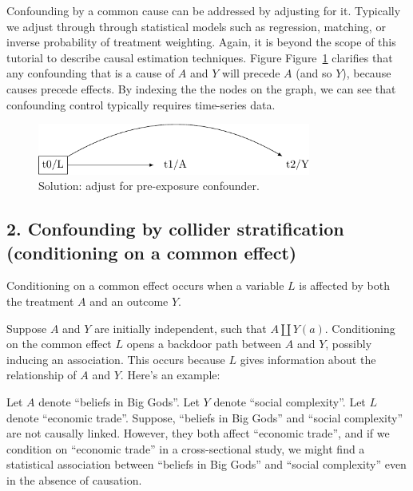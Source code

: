 \documentclass[
  singlecolumn]{report}
\begin{document}
Confounding by a common cause can be addressed by adjusting for it.
Typically we adjust through through statistical models such as
regression, matching, or inverse probability of treatment weighting.
Again, it is beyond the scope of this tutorial to describe causal
estimation techniques. Figure Figure~\ref{fig-dag-common-cause-solution}
clarifies that any confounding that is a cause of \(A\) and \(Y\) will
precede \(A\) (and so \(Y\)), because causes precede effects. By
indexing the the nodes on the graph, we can see that confounding control
typically requires time-series data.

\begin{figure}

{\centering \includegraphics[width=0.8\textwidth,height=\textheight]{causal-dags_files/figure-pdf/fig-dag-common-cause-solution-1.pdf}

}

\caption{\label{fig-dag-common-cause-solution}Solution: adjust for
pre-exposure confounder.}

\end{figure}

\hypertarget{confounding-by-collider-stratification-conditioning-on-a-common-effect}{%
\subsection{2. Confounding by collider stratification (conditioning on a
common
effect)}\label{confounding-by-collider-stratification-conditioning-on-a-common-effect}}

Conditioning on a common effect occurs when a variable \(L\) is affected
by both the treatment \(A\) and an outcome \(Y\).

Suppose \(A\) and \(Y\) are initially independent, such that
\(A \coprod Y(a)\). Conditioning on the common effect \(L\) opens a
backdoor path between \(A\) and \(Y\), possibly inducing an association.
This occurs because \(L\) gives information about the relationship of
\(A\) and \(Y\). Here's an example:

Let \(A\) denote ``beliefs in Big Gods''. Let \(Y\) denote ``social
complexity''. Let \(L\) denote ``economic trade''. Suppose, ``beliefs in
Big Gods'' and ``social complexity'' are not causally linked. However,
they both affect ``economic trade'', and if we condition on ``economic
trade'' in a cross-sectional study, we might find a statistical
association between ``beliefs in Big Gods'' and ``social complexity''
even in the absence of causation.
\end{document}
